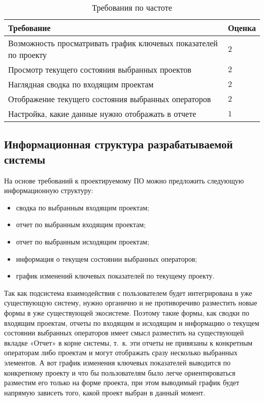 \begin{table}[ht]
    \caption{Требования по частоте}
    \begin{small}
        \begin{tabular}{|p{}|p{}|}
            \hline
            Требование                          & Оценка \\
            \hline
            Возможность просматривать график ключевых показателей по проекту & $2$  \\
            \hline
            Просмотр текущего состояния выбранных проектов          & $2$    \\
            \hline
            Наглядная сводка по входящим проектам               & $2$ \\
            \hline
            Отображение текущего состояния выбранных операторов              & $2$ \\
            \hline
            Настройка, какие данные нужно отображать в отчете              & $1$ \\
            \hline
        \end{tabular}
    \end{small}
    \label{tab:req:frequency}
\end{table}

\subsection{Информационная структура разрабатываемой системы}

На основе требований к проектируемому ПО можно предложить следующую информационную структуру:
\begin{itemize}
    \item сводка по выбранным входящим проектам;
    \item отчет по выбранным входящим проектам;
    \item отчет по выбранным исходящим проектам;
    \item информация о текущем состоянии выбранных операторов;
    \item график изменений ключевых показателей по текущему проекту.
\end{itemize}

Так как подсистема взаимодействия с пользователем %
будет интегрирована в уже существующую систему,
нужно органично и не противоречиво разместить новые формы в уже существующей экосистеме.
Поэтому такие формы, как сводки по входящим проектам,
отчеты по входящим и исходящим
и информацию о текущем состоянии выбранных операторов имеет смысл разместить на существующей вкладке
«Отчет» в корне системы,
т.~к. эти отчеты не привязаны к конкретным операторам либо проектам и могут
отображать сразу несколько выбранных элементов.
А вот график изменения ключевых
показателей выводится по конкретному проекту и что бы пользователям было легче
ориентироваться разместим его только на форме проекта,
при этом выводимый график будет напрямую зависеть того,
какой проект выбран в данный момент.


